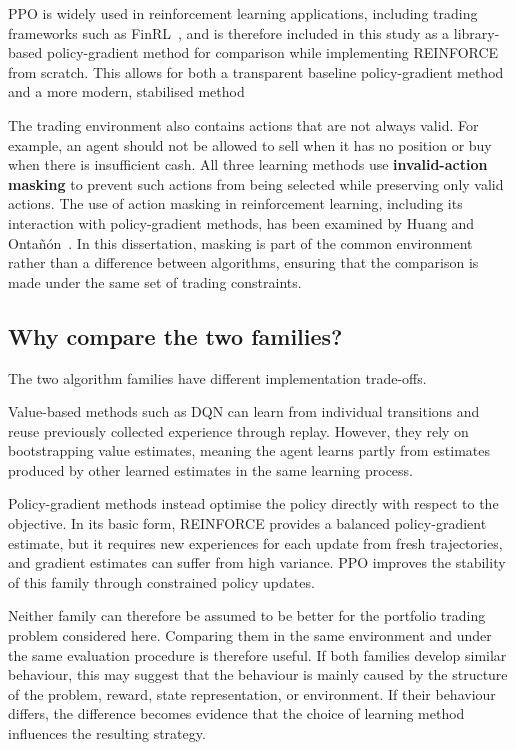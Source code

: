 PPO is widely used in reinforcement learning applications, including
trading frameworks such as FinRL~\cite{liu2020finrl}, and is therefore included in
this study as a library-based policy-gradient method for comparison
while implementing REINFORCE from scratch. This allows for both a
transparent baseline policy-gradient method and a more modern,
stabilised method

The trading environment also contains actions that are not always valid.
For example, an agent should not be allowed to sell when it has no
position or buy when there is insufficient cash. All three learning
methods use \textbf{invalid-action masking} to prevent such actions from
being selected while preserving only valid actions. The use of action
masking in reinforcement learning, including its interaction with
policy-gradient methods, has been examined by Huang and Ontañón~\cite{huang2022masking}. In this dissertation, masking is part of the common
environment rather than a difference between algorithms, ensuring that
the comparison is made under the same set of trading constraints.

\subsection{Why compare the two families?}
The two algorithm families have different implementation trade-offs.

Value-based methods such as DQN can learn from individual transitions
and reuse previously collected experience through replay. However, they
rely on bootstrapping value estimates, meaning the agent learns partly
from estimates produced by other learned estimates in the same learning
process.

Policy-gradient methods instead optimise the policy directly with
respect to the objective. In its basic form, REINFORCE provides a
balanced policy-gradient estimate, but it requires new experiences for
each update from fresh trajectories, and gradient estimates can suffer
from high variance. PPO improves the stability of this family through
constrained policy updates.

Neither family can therefore be assumed to be better for the portfolio
trading problem considered here. Comparing them in the same environment
and under the same evaluation procedure is therefore useful. If both
families develop similar behaviour, this may suggest that the behaviour
is mainly caused by the structure of the problem, reward, state
representation, or environment. If their behaviour differs, the
difference becomes evidence that the choice of learning method
influences the resulting strategy.

